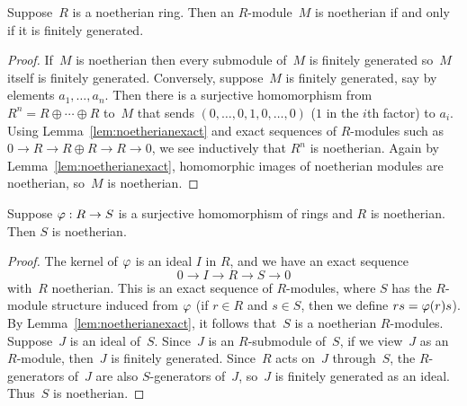 \begin{proposition}\label{prop:noethfg}
Suppose~$R$ is a noetherian ring.  Then an $R$-module~$M$ is 
noetherian if and only if it is finitely generated. 
\end{proposition}
\begin{proof}
If~$M$ is noetherian then every submodule of~$M$ is finitely generated
so~$M$ itself is finitely generated.  Conversely, suppose~$M$ is finitely
generated, say by elements $a_1,\ldots, a_n$.  Then there is a
surjective homomorphism from $R^n=R\oplus \cdots \oplus R$ to~$M$ that
sends $(0,\ldots,0,1,0,\ldots,0)$ ($1$ in the $i$th factor) to $a_i$.
Using Lemma~\ref{lem:noetherianexact} and exact sequences of
$R$-modules such as $0\to R\to R\oplus R\to R\to 0$, we see
inductively that $R^n$ is noetherian.  Again by
Lemma~\ref{lem:noetherianexact}, homomorphic images of noetherian
modules are noetherian, so~$M$ is noetherian.
\end{proof}

\begin{lemma}\label{lem:surjnoetherian}
Suppose $\varphi:R\to S$ is a surjective homomorphism of rings 
and $R$ is noetherian.   Then $S$ is noetherian.
\end{lemma}
\begin{proof}
The kernel of $\varphi$ is an ideal $I$ in $R$, and
we have an exact sequence 
$$ 
  0 \to I \to R \to S \to 0
$$
with~$R$ noetherian.  
This is an exact sequence of $R$-modules, where $S$ has the
$R$-module structure induced from $\varphi$ (if $r\in R$
and $s\in S$, then we define $rs = \varphi(r)s$).
By Lemma~\ref{lem:noetherianexact}, it follows
that~$S$ is a noetherian $R$-modules.  Suppose~$J$ is an ideal of~$S$.
Since~$J$ is an $R$-submodule of~$S$, if we view~$J$ as an $R$-module,
then~$J$ is finitely generated.  Since~$R$ acts on~$J$ through~$S$,
the $R$-generators of~$J$ are also $S$-generators of~$J$, so~$J$ 
is finitely generated as an ideal.  Thus~$S$ is noetherian.
\end{proof}

